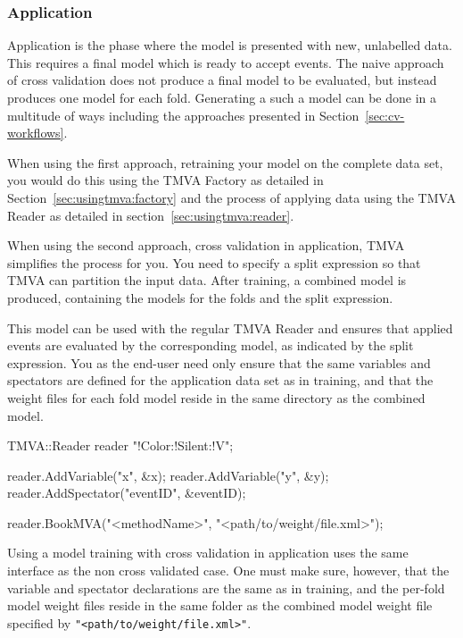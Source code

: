 










\subsubsection{Application}
\label{sec:cv-application}

Application is the phase where the model is presented with new, unlabelled data. This requires a final model which is ready to accept events. The naive approach of cross validation does not produce a final model to be evaluated, but instead produces one model for each fold. Generating a such a model can be done in a multitude of ways including the approaches presented in Section~\ref{sec:cv-workflows}.

When using the first approach, retraining your model on the complete data set, you would do this using the TMVA Factory as detailed in Section~\ref{sec:usingtmva:factory} and the process of applying data using the TMVA Reader as detailed in section~\ref{sec:usingtmva:reader}.

When using the second approach, cross validation in application, TMVA simplifies the process for you. You need to specify a split expression so that TMVA can partition the input data. After training, a combined model is produced, containing the models for the folds and the split expression.

This model can be used with the regular TMVA Reader and ensures that applied events are evaluated by the corresponding model, as indicated by the split expression. You as the end-user need only ensure that the same variables and spectators are defined for the application data set as in training, and that the weight files for each fold model reside in the same directory as the combined model.

\begin{codeexample}
\begin{tmvacode}
TMVA::Reader reader {"!Color:!Silent:!V"};

reader.AddVariable("x", &x);
reader.AddVariable("y", &y);
reader.AddSpectator("eventID", &eventID);

reader.BookMVA("<methodName>", "<path/to/weight/file.xml>");
\end{tmvacode}
\caption[.]{\codeexampleCaptionSize Using a model training with cross validation in application uses the same interface as the non cross validated case. One must make sure, however, that the variable and spectator declarations are the same as in training, and the per-fold model weight files reside in the same folder as the combined model weight file specified by \texttt{"<path/to/weight/file.xml>"}.}
\label{code:cv-application}
\end{codeexample}
